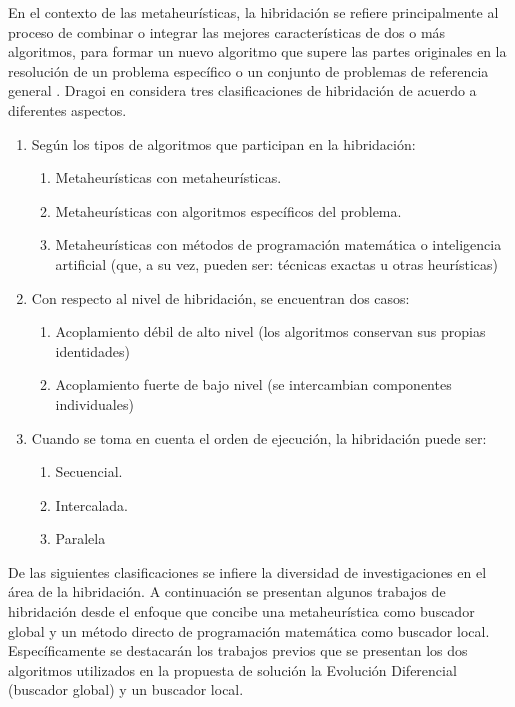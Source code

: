 En el contexto de las metaheurísticas, la hibridación se refiere principalmente al proceso de combinar o integrar las mejores características de dos o más algoritmos, para formar un nuevo algoritmo que supere las partes originales en la resolución de un problema específico o un conjunto de problemas de referencia general \cite{Swagatam_2011}. Dragoi en \cite{Dragoi_2015} considera tres clasificaciones de hibridación de acuerdo a diferentes aspectos.
\begin{enumerate}
\item  Según los tipos de algoritmos que participan en la hibridación:
\begin{enumerate}
\item Metaheurísticas con metaheurísticas.
\item Metaheurísticas con algoritmos específicos del problema.
\item Metaheurísticas con métodos de programación matemática o inteligencia artificial (que, a su vez, pueden ser: técnicas exactas u otras heurísticas)
\end{enumerate}

\item Con respecto al nivel de hibridación, se encuentran dos casos:
\begin{enumerate}
\item Acoplamiento débil de alto nivel (los algoritmos conservan sus propias identidades)
\item Acoplamiento fuerte de bajo nivel (se intercambian componentes individuales)
\end{enumerate}

\item Cuando se toma en cuenta el orden de ejecución, la hibridación puede ser: 
\begin{enumerate}
\item  Secuencial.
\item  Intercalada.
\item  Paralela
\end{enumerate}
\end{enumerate}
De las siguientes clasificaciones se infiere la diversidad de investigaciones en el área de la hibridación. A continuación se presentan algunos trabajos de hibridación desde el enfoque que concibe una metaheurística como buscador global y un método directo de programación matemática como buscador local. Específicamente se destacarán los trabajos previos que se presentan los dos algoritmos utilizados en la propuesta de solución la Evolución Diferencial (buscador global) y un buscador local.

